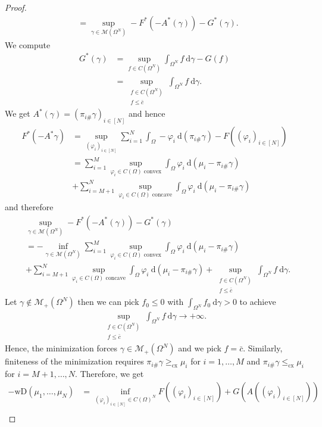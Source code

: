 \documentclass[10pt,a4paper]{amsart}
\newcommand{\dd}{\mathrm{d}}
\begin{document}
\begin{proof}
\begin{align*}
		&=\sup_{\gamma\in\mathcal M(\Omega^N)}-F^*(-A^*(\gamma))-G^*(\gamma).
	\end{align*}
	We compute
	\begin{align*}
		G^*(\gamma)&=\sup_{f\in C(\Omega^N)}\int_{\Omega^N}f\ \dd\gamma-G(f)\\
		&=\sup_{\substack{f\in C(\Omega^N)\\ f\leq \bar c}}\int_{\Omega^N}f\ \dd\gamma.
	\end{align*}
	We get $A^*(\gamma)=(\pi_{i\#}\gamma)_{i\in[N]}$ and hence
	\begin{align*}
		F^*(-A^*\gamma)&=\sup_{(\varphi_i)_{i\in[N]}}\sum_{i=1}^N\int_\Omega-\varphi_i\ \dd(\pi_{i\#}\gamma)-F((\varphi_i)_{i\in[N]})\\
		&=\sum_{i=1}^M\sup_{\varphi_i\in C(\Omega)\text{ convex}}\int_\Omega\varphi_i\ \dd(\mu_i-\pi_{i\#}\gamma)\\
		&+\sum_{i=M+1}^N\sup_{\varphi_i\in C(\Omega)\text{ concave}}\int_\Omega\varphi_i\ \dd(\mu_i-\pi_{i\#}\gamma)
	\end{align*}
	and therefore
	\begin{align*}
		&\sup_{\gamma\in\mathcal M(\Omega^N)}-F^*(-A^*(\gamma))-G^*(\gamma)\\
		&=-\inf_{\gamma\in\mathcal M(\Omega^N)}\sum_{i=1}^M\sup_{\varphi_i\in C(\Omega)\text{ convex}}\int_\Omega\varphi_i\ \dd(\mu_i-\pi_{i\#}\gamma)\\
		&+\sum_{i=M+1}^N\sup_{\varphi_i\in C(\Omega)\text{ concave}}\int_\Omega\varphi_i\ \dd(\mu_i-\pi_{i\#}\gamma)+\sup_{\substack{f\in C(\Omega^N)\\ f\leq \bar c}}\int_{\Omega^N}f\ \dd\gamma.
	\end{align*}
	Let $\gamma\notin\mathcal M_+(\Omega^N)$ then we can pick $f_0\leq 0$ with $\int_{\Omega^N}f_0\ \dd\gamma> 0$ to achieve
	\begin{gather*}
		\sup\limits_{\substack{f\in C(\Omega^N)\\ f\leq \bar c}}\int_{\Omega^N}f\ \dd\gamma\rightarrow+\infty.
	\end{gather*}
	Hence, the minimization forces $\gamma\in\mathcal M_+(\Omega^N)$ and we pick $f=\bar c$. Similarly, finiteness of the minimization requires $\pi_{i\#}\gamma\geq_{\text{cx}}\mu_i$ for $i=1,\dots,M$ and $\pi_{i\#}\gamma\leq_{\text{cx}}\mu_i$ for $i=M+1,\dots,N$. Therefore, we get
	\begin{align*}
		-\text{wD}(\mu_1,\dots,\mu_N)&=\inf_{(\varphi_i)_{i\in[N]}\in C(\Omega)^N} F((\varphi_i)_{i\in[N]})+ G(A((\varphi_i)_{i\in[N]}))\\

\end{align*}
\end{proof}
\end{document}
